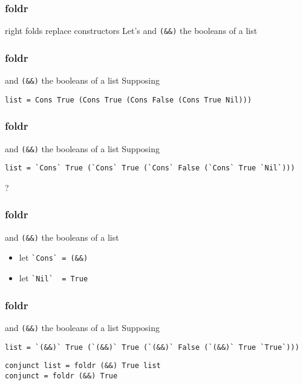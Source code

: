 %

\begin{frame}[fragile]
\frametitle{foldr}
\begin{block}{right folds replace constructors}
Let's and \lstinline{(&&)} the booleans of a list
\end{block}
\end{frame}

\begin{frame}[fragile]
\frametitle{foldr}
\begin{block}{and \lstinline{(&&)} the booleans of a list}
Supposing 
\begin{lstlisting}[style=haskell,basicstyle=\tiny\ttfamily,mathescape]
list = Cons True (Cons True (Cons False (Cons True Nil)))
\end{lstlisting}
\end{block}
\end{frame}

\begin{frame}[fragile]
\frametitle{foldr}
\begin{block}{and \lstinline{(&&)} the booleans of a list}
Supposing 
\begin{lstlisting}[style=haskell,basicstyle=\tiny\ttfamily,mathescape]
list = `Cons` True (`Cons` True (`Cons` False (`Cons` True `Nil`)))
\end{lstlisting}
\end{block}
\begin{center}
\LARGE
?
\end{center}
\end{frame}

\begin{frame}[fragile]
\frametitle{foldr}
\begin{block}{and \lstinline{(&&)} the booleans of a list}
\begin{itemize}
\item let \lstinline{`Cons` = (&&)}
\item let \lstinline{`Nil`  = True}
\end{itemize}
\end{block}
\end{frame}

\begin{frame}[fragile]
\frametitle{foldr}
\begin{block}{and \lstinline{(&&)} the booleans of a list}
Supposing
\begin{lstlisting}[style=haskell,basicstyle=\tiny\ttfamily,mathescape]
list = `(&&)` True (`(&&)` True (`(&&)` False (`(&&)` True `True`)))
\end{lstlisting}
\end{block}
\begin{lstlisting}[style=haskell,basicstyle=\scriptsize\ttfamily,mathescape]
conjunct list = foldr (&&) True list
conjunct = foldr (&&) True
\end{lstlisting}
\end{frame}

